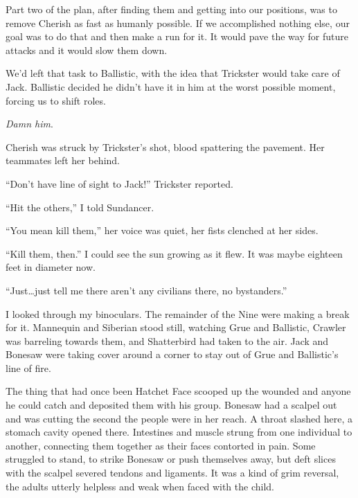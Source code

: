 Part two of the plan, after finding them and getting into our positions, was to remove Cherish as fast as humanly possible.  If we accomplished nothing else, our goal was to do that and then make a run for it.  It would pave the way for future attacks and it would slow them down.



We'd left that task to Ballistic, with the idea that Trickster would take care of Jack.  Ballistic decided he didn't have it in him at the worst possible moment, forcing us to shift roles.



\emph{Damn him}.



Cherish was struck by Trickster's shot, blood spattering the pavement.  Her teammates left her behind.



``Don't have line of sight to Jack!'' Trickster reported.



``Hit the others,'' I told Sundancer.



``You mean kill them,'' her voice was quiet, her fists clenched at her sides.



``Kill them, then.''  I could see the sun growing as it flew.  It was maybe eighteen feet in diameter now.



``Just\ldots just tell me there aren't any civilians there, no bystanders.''



I looked through my binoculars.  The remainder of the Nine were making a break for it.  Mannequin and Siberian stood still, watching Grue and Ballistic, Crawler was barreling towards them, and Shatterbird had taken to the air.  Jack and Bonesaw were taking cover around a corner to stay out of Grue and Ballistic's line of fire.



The thing that had once been Hatchet Face scooped up the wounded and anyone he could catch and deposited them with his group.  Bonesaw had a scalpel out and was cutting the second the people were in her reach.  A throat slashed here, a stomach cavity opened there.  Intestines and muscle strung from one individual to another, connecting them together as their faces contorted in pain.  Some struggled to stand, to strike Bonesaw or push themselves away, but deft slices with the scalpel severed tendons and ligaments.  It was a kind of grim reversal, the adults utterly helpless and weak when faced with the child.



